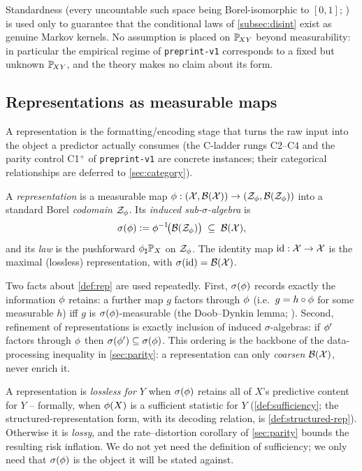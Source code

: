 Standardness (every uncountable such space being Borel-isomorphic to
$[0,1]$; \citealp[Thm.~A1.2]{kallenberg2002foundations}) is used only to
guarantee that the conditional laws of \cref{subsec:disint} exist as genuine
Markov kernels. No assumption is placed on $\mathbb{P}_{\!XY}$ beyond measurability: in
particular the empirical regime of \texttt{preprint-v1} corresponds to a
fixed but unknown $\mathbb{P}_{\!XY}$, and the theory makes no claim about its form.

\subsection{Representations as measurable maps}
\label{subsec:rep}

A representation is the formatting/encoding stage that turns the raw input
into the object a predictor actually consumes (the C-ladder rungs C2--C4 and
the parity control C1$^{+}$ of \texttt{preprint-v1} are concrete instances;
their categorical relationships are deferred to \cref{sec:category}).

\begin{definition}[Representation]
\label{def:rep}
A \emph{representation} is a measurable map $\phi : (\mathcal{X}, \mathcal{B}(\mathcal{X}))
\to (\mathcal{Z}_{\phi}, \mathcal{B}(\mathcal{Z}_{\phi}))$ into a standard Borel
\emph{codomain} $\mathcal{Z}_{\phi}$. Its \emph{induced sub-$\sigma$-algebra} is
\[
  \sigma\!\left(\phi\right) \vcentcolon= \phi^{-1}\!\big(\mathcal{B}(\mathcal{Z}_{\phi})\big)
            \;\subseteq\; \mathcal{B}(\mathcal{X}),
\]
and its \emph{law} is the pushforward ${\phi}_{\sharp}\mathbb{P}_X$ on
$\mathcal{Z}_{\phi}$. The identity map $\mathrm{id}:\mathcal{X}\to\mathcal{X}$ is the
maximal (lossless) representation, with $\sigma\!\left(\mathrm{id}\right) = \mathcal{B}(\mathcal{X})$.
\end{definition}

Two facts about \cref{def:rep} are used repeatedly. First, $\sigma\!\left(\phi\right)$ records
exactly the information $\phi$ retains: a further map $g$ factors through
$\phi$ (i.e.\ $g = h \circ \phi$ for some measurable $h$) iff $g$ is
$\sigma\!\left(\phi\right)$-measurable (the Doob--Dynkin lemma;
\citealp[Lem.~1.13]{kallenberg2002foundations}). Second, refinement of
representations is exactly inclusion of induced $\sigma$-algebras: if $\phi'$
factors through $\phi$ then $\sigma\!\left(\phi'\right) \subseteq \sigma\!\left(\phi\right)$. This ordering
is the backbone of the data-processing inequality in \cref{sec:parity}: a
representation can only \emph{coarsen} $\mathcal{B}(\mathcal{X})$, never enrich it.

\begin{remark}
\label{rem:lossy}
A representation is \emph{lossless for $Y$} when $\sigma\!\left(\phi\right)$ retains all of
$X$'s predictive content for $Y$ -- formally, when $\phi(X)$ is a sufficient
statistic for $Y$ (\cref{def:sufficiency}; the structured-representation form,
with its decoding relation, is \cref{def:structured-rep}). Otherwise it is
\emph{lossy}, and the rate--distortion corollary of \cref{sec:parity} bounds
the resulting risk inflation. We do not yet need the definition of
sufficiency; we only need that $\sigma\!\left(\phi\right)$ is the object it will be stated
against.
\end{remark}


